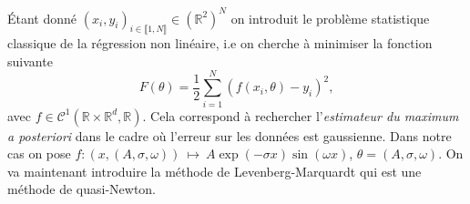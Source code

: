 \documentclass[a4paper,french,12pt]{article}
\begin{document}
Étant donné $(x_i,y_i)_{i \in \llbracket 1,N \rrbracket} \in \left(\mathbb{R}^2\right)^N$ on introduit le problème statistique classique de la régression non linéaire, i.e on cherche à minimiser la fonction suivante
\[ F(\theta) = \frac{1}{2} \sum_{i=1}^N (f(x_i, \theta) - y_i)^2, \]
avec $f \in \mathcal{C}^1(\mathbb{R} \times \mathbb{R}^d, \mathbb{R})$. Cela correspond à rechercher l'\textit{estimateur du maximum a posteriori} dans le cadre où l'erreur sur les données est gaussienne. 
Dans notre cas on pose $f : (x,(A,\sigma,\omega)) \ \mapsto \ A \exp(-\sigma x) \sin(\omega x)$, $\theta =(A,\sigma,\omega)$. On va maintenant introduire  la méthode de Levenberg-Marquardt qui est une méthode de quasi-Newton.
\end{document}

